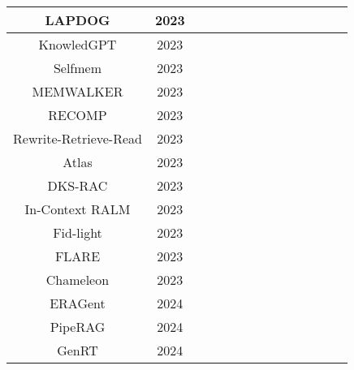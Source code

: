 \begin{table}[htb]
{\begin{tabular}{|c|c|c|c|c|c|c|c|c|c|c|c|c|c|}
			\hline
			LAPDOG \cite{huang2023learning} & 2023 & & \Checkmark & & \Checkmark & & \Checkmark & & \Checkmark & \Checkmark & & \Checkmark & \Checkmark \\
			\hline
			KnowledGPT \cite{wang2023knowledgpt} & 2023 &  & \Checkmark & \Checkmark &  &  & \Checkmark & \Checkmark &  &  &  &  &  \\ 
			\hline
			Selfmem \cite{cheng2023lift} & 2023 &  & \Checkmark & \Checkmark & \Checkmark &  &  &  &  & \Checkmark &  & \Checkmark &  \\ 
			\hline
			MEMWALKER \cite{chen2023walking} & 2023 &  & \Checkmark &  &  & \Checkmark &  &  & \Checkmark &  &  & \Checkmark &  \\ 
			\hline
			RECOMP \cite{xu2024recomp} & 2023 &  & \Checkmark &  & \Checkmark &  &  &  &  &  & \Checkmark &  &  \\ 
			\hline
			Rewrite-Retrieve-Read \cite{ma2023query} & 2023 &  & \Checkmark &  & \Checkmark &  & \Checkmark &  &  &  &  &  &  \\ 
			\hline
			Atlas \cite{ma2023query} & 2023 &  & \Checkmark & \Checkmark & \Checkmark & \Checkmark &  &  & \Checkmark & \Checkmark &  &  &  \\ 
			\hline
			DKS-RAC \cite{huang2023retrieval} & 2023 &  & \Checkmark & \Checkmark & \Checkmark &  &  &  &  & \Checkmark & \Checkmark &  &  \\ 
			\hline
			In-Context RALM \cite{ram2023incontext} & 2023 &  & \Checkmark &  &  &  &  &  &  & \Checkmark &  &  &  \\ 
			\hline
			Fid-light \cite{hofstätter2023fidlight} & 2023 &  & \Checkmark & \Checkmark &  &  &  &  &  & \Checkmark &  &  &  \\ 
			\hline
			FLARE \cite{jiang2023active} & 2023 &  & \Checkmark &  &  &  & \Checkmark &  & \Checkmark &  &  &  &  \\
			\hline
			Chameleon \cite{jiang2023chameleon} & 2023 & & \Checkmark & & \Checkmark & \Checkmark & & & \Checkmark & & & & \\
			\hline
			ERAGent \cite{shi2024eragent} & 2024 & \Checkmark & \Checkmark &&\Checkmark& &\Checkmark&&\Checkmark&&\Checkmark&\Checkmark&\Checkmark \\
			\hline
			PipeRAG \cite{jiang2024piperag} & 2024 & & \Checkmark & \Checkmark & \Checkmark & \Checkmark & & & & & & \Checkmark & \\
			\hline
			GenRT \cite{xu2024listaware} & 2024 & \Checkmark & & & \Checkmark & & & & & \Checkmark & \Checkmark & & \\

\end{tabular}}
\end{table}
